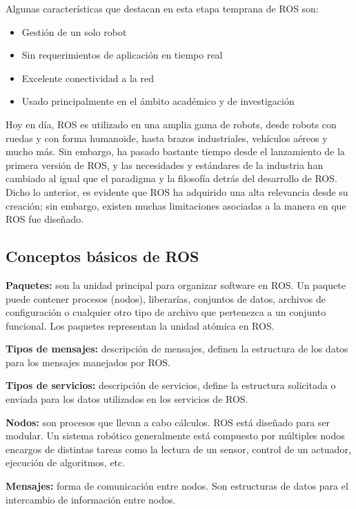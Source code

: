 Algunas características que destacan en esta etapa temprana de ROS son:
\begin{itemize}
    \item Gestión de un solo robot
    \item Sin requerimientos de aplicación en tiempo real
    \item Excelente conectividad a la red
    \item Usado principalmente en el ámbito académico y de investigación
\end{itemize}

Hoy en día, ROS es utilizado en una amplia gama de robots, desde robots con ruedas y con forma humanoide, hasta brazos industriales, vehículos aéreos y mucho más. Sin embargo, ha pasado bastante tiempo desde el lanzamiento de la primera versión de ROS, y las necesidades y estándares de la industria han cambiado al igual que el paradigma y la filosofía detrás del desarrollo de ROS. Dicho lo anterior, es evidente que ROS ha adquirido una alta relevancia desde su creación; sin embargo, existen muchas limitaciones asociadas a la manera en que ROS fue diseñado. 

\subsection{Conceptos básicos de ROS}

\textbf{Paquetes:} son la unidad principal para organizar software en ROS. Un paquete puede contener procesos (nodos), liberarías, conjuntos de datos, archivos de configuración o cualquier otro tipo de archivo que pertenezca a un conjunto funcional.  Los paquetes representan la unidad atómica en ROS.

\textbf{Tipos de mensajes:} descripción de mensajes, definen la estructura de los datos para los mensajes manejados por ROS.

\textbf{Tipos de servicios:} descripción de servicios, define la estructura solicitada o enviada para los datos utilizados en los servicios de ROS.

\textbf{Nodos:} son procesos que llevan a cabo cálculos. ROS está diseñado para ser modular. Un sistema robótico generalmente está compuesto por múltiples nodos encargos de distintas tareas como la lectura de un sensor, control de un actuador, ejecución de algoritmos, etc.

\textbf{Mensajes:} forma de comunicación entre nodos. Son estructuras de datos para el intercambio de información entre nodos.

